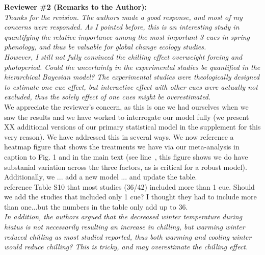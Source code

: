 \documentclass[11pt, a4paper]{article}
\newcommand{\lr}[1]{line~\lineref{#1}}
\begin{document}
{\bf Reviewer \#2 (Remarks to the Author):}\\

\emph{Thanks for the revision. The authors made a good response, and most of my concerns were responded. As I pointed before, this is an interesting study in quantifying the relative importance among the most important 3 cues in spring phenology, and thus be valuable for global change ecology studies. }\\


\emph{However, I still not fully convinced the chilling effect overweight forcing and photoperiod. Could the uncertainty in the experimental studies be quantified in the hierarchical Bayesian model? The experimental studies were theologically designed to estimate one cue effect, but interactive effect with other cues were actually not excluded, thus the solely effect of one cues might be overestimated.}\\ 


We appreciate the reviewer's concern, as this is one we had ourselves when we saw the results and we have worked to interrogate our model fully (we present XX additional versions of our primary statistical model in the supplement for this very reason). We have addressed this in several ways. We now reference a heatmap figure that shows the treatments we have via our meta-analysis in  caption to Fig. 1 and in the main text (see \lr{heatmap}, this figure shows we do have substanial variation across the three factors, as is critical for a robust model). Additionally, we  ... add a new model ... and update the table.\\

 reference Table  S10 that most studies (36/42)  included more than 1 cue. Should we add the studies that included only 1 cue? I thought they had to include more than one...but the numbers in the table only add up to 36.\\

\emph{In addition, the authors argued that the decreased winter temperature during hiatus is not necessarily resulting an increase in chilling, but warming winter reduced chilling as most studied reported, thus both warming and cooling winter would reduce chilling? This is tricky, and may overestimate the chilling effect.}\\
\end{document}

